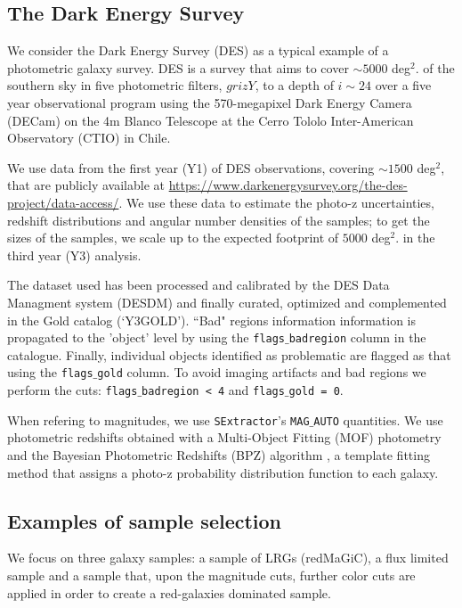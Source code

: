 \documentclass[a4paper,fleqn,usenatbib]{mnras}
\begin{document}
\subsection{The Dark Energy Survey}


We consider the Dark Energy Survey (DES) as a typical example of a photometric galaxy survey. DES is a  survey that aims to cover $\sim 5000$  deg$^2$. of the southern sky in five photometric filters, $grizY$, to a depth of $i \sim 24$ over a five year observational program using the 570-megapixel Dark Energy Camera (DECam) on the 4m Blanco Telescope at the Cerro Tololo Inter-American Observatory (CTIO) in Chile.

We use data from the first year (Y1) of DES observations, covering $\sim 1500$ deg$^2$, that are publicly available at  \url{https://www.darkenergysurvey.org/the-des-project/data-access/}. We use these data to estimate the photo-z uncertainties, redshift distributions and angular number densities of the samples; to get the sizes of the samples, we scale up to the expected footprint of $5000$  deg$^2$. in the third year (Y3) analysis.

The dataset used has been processed and calibrated by the DES Data Managment system (DESDM) and finally curated, optimized and complemented in the Gold catalog (`Y3GOLD'). ``Bad" regions information information is propagated to the 'object' level by using the \texttt{flags{$\_$}badregion} column in the catalogue. Finally, individual objects identified as problematic are flagged as that using the \texttt{flags{$\_$}gold} column. To avoid imaging artifacts and bad regions we perform the cuts: \texttt{flags{$\_$}badregion < 4} and \texttt{flags{$\_$}gold = 0}.

When refering to magnitudes, we use \texttt{SExtractor}'s \citep{Bertin1996}  \texttt{MAG{$\_$}AUTO} quantities. We use photometric redshifts obtained with a Multi-Object Fitting (MOF) photometry \citep[section 6.3]{Drlica2018} and the Bayesian Photometric Redshifts (BPZ) algorithm \citep{Benitez}, a template fitting method that assigns a photo-z probability distribution function to each galaxy.



\subsection{Examples of sample selection}

We focus on three galaxy samples: a sample of LRGs (redMaGiC), a flux limited sample and a sample that, upon the magnitude cuts, further color cuts are applied in order to create a red-galaxies dominated sample.
\end{document}

